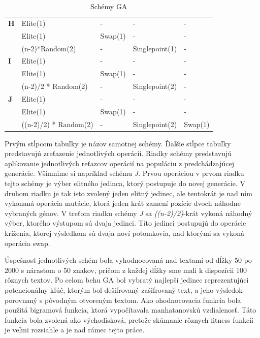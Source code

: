 \begin{table}[!htbp]
\begin{tabular}{@{}lllll@{}}
\textbf{H}      & Elite(1)                  & -                & -                 & -                    \\
                & Elite(1)                  & Swap(1)          & -                 & -                    \\
                & (n-2)*Random(2)           & -                & Singlepoint(1)    & -                    \\ \midrule
\textbf{I}      & Elite(1)                  & -                & -                 & -                    \\
                & Elite(1)                  & Swap(1)          & -                 & -                    \\
                & (n-2)/2 * Random(2)       & -                & Singlepoint(2)    & -                    \\ \midrule
\textbf{J}      & Elite(1)                  & -                & -                 & -                    \\
                & Elite(1)                  & Swap(1)          & -                 & -                    \\
                & ((n-2)/2) * Random(2)     & -                & Singlepoint(2)    & Swap(1)              \\ \bottomrule
\end{tabular}
\caption{Schémy GA}
\label{tab:schemy}
\end{table}

Prvým stĺpcom tabuľky je názov samotnej schémy. Ďalšie stĺpce tabuľky predstavujú zreťazenie jednotlivých operácií. Riadky schémy predstavujú aplikovanie jednotlivých reťazcov operácií na populáciu z predchádzajúcej generácie.
Všimnime si napríklad schému \textit{J}.
Prvou operáciou v prvom riadku tejto schémy je výber elitného jedinca, ktorý postupuje do novej generácie.
V druhom riadku je tak isto zvolený jeden elitný jedinec, ale tentokrát je nad ním vykonaná operácia mutácie, ktorá jeden krát zamení pozície dvoch náhodne vybraných génov.
V treťom riadku schémy \textit{J} sa \textit{((n-2)/2)}-krát vykoná náhodný výber, ktorého výstupom sú dvaja jedinci. Títo jedinci postupujú do operácie kríženia, ktorej výsledkom sú dvaja noví potomkovia, nad ktorými sa vykoná operácia swap.

Úspešnosť jednotlivých schém bola vyhodnocovaná nad textami od dĺžky 50 po 2000 s nárastom o 50 znakov,
pričom z každej dĺžky sme mali k dispozícii 100 rôznych textov.
Po celom behu GA bol vybratý najlepší jedinec reprezentujúci potencionálny kľúč,
ktorým bol dešifrovaný zašifrovaný text, a jeho výsledok porovnaný s pôvodným otvoreným textom.
Ako ohodnocovacia funkcia bola použitá bigramová funkcia, ktorá vypočítavala manhatanovskú vzdialenosť.
Táto funkcia bola zvolená ako východisková, pretože skúmanie rôznych fitness funkcií je veľmi rozsiahle a je nad rámec tejto práce.

